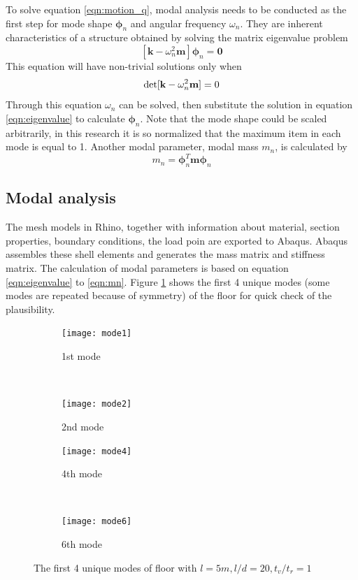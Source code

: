 To solve equation \ref{eqn:motion_q}, modal analysis needs to be conducted as the first step for mode shape $\boldsymbol{\phi}_n$ and angular frequency $\omega_n$. They are inherent characteristics of a structure obtained by solving the matrix eigenvalue problem
\begin{equation}
\label{eqn:eigenvalue}
    \left[\textbf{k}-\omega_n^2\textbf{m}\right]\boldsymbol{\phi}_n=\textbf{0}
\end{equation}
\noindent
This equation will have non-trivial solutions only when
\begin{equation}
\label{eqn:eigenvalue_det}
    \text{det}[\textbf{k}-\omega_n^2\textbf m]=0
\end{equation}
\noindent
Through this equation $\omega_n$ can be solved, then substitute the solution in equation \ref{eqn:eigenvalue} to calculate $\boldsymbol{\phi}_n$. Note that the mode shape could be scaled arbitrarily, in this research it is so normalized that the maximum item in each mode is equal to 1. Another modal parameter, modal mass $m_n$, is calculated by
\begin{equation}
\label{eqn:mn}
    m_n = \boldsymbol{\phi}_n^T\textbf{m}\boldsymbol{\phi}_n
\end{equation}

\subsection{Modal analysis}
The mesh models in Rhino, together with information about material, section properties, boundary conditions, the load poin are exported to Abaqus. Abaqus assembles these shell elements and generates the mass matrix and stiffness matrix. The calculation of  modal parameters is based on equation \ref{eqn:eigenvalue} to \ref{eqn:mn}. Figure \ref{fig:mode_shapes} shows the first 4 unique modes (some modes are repeated because of symmetry) of the floor for quick check of the plausibility.
\begin{figure}[H]
\begin{subfigure}[b]{.48\textwidth}
  \centering
  \texttt{[image: mode1]}
  \caption{1st mode}
\end{subfigure}
~
\begin{subfigure}[b]{.48\textwidth}
  \centering
  \texttt{[image: mode2]}
  \caption{2nd mode}
\end{subfigure}

\begin{subfigure}[b]{.48\textwidth}
  \centering
  \texttt{[image: mode4]}
  \caption{4th mode}
\end{subfigure}
~
\begin{subfigure}[b]{.48\textwidth}
  \centering
  \texttt{[image: mode6]}
  \caption{6th mode}
\end{subfigure}

\caption{The first 4 unique modes of floor with $l=5m, l/d=20, t_v/t_r=1$}
\label{fig:mode_shapes}
\end{figure}



